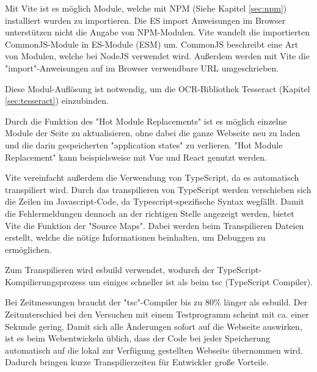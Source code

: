 

Mit Vite ist es möglich Module, welche mit NPM (Siehe Kapitel \ref{sec:npm}) installiert wurden zu importieren. 
Die ES import Anweisungen im Browser unterstützen nicht die Angabe von NPM-Modulen. Vite wandelt die importierten CommonJS-Module in ES-Module (ESM) um. CommonJS beschreibt eine Art von Modulen, welche bei NodeJS verwendet wird. Außerdem werden mit Vite die "import"-Anweisungen auf im Browser verwendbare URL umgeschrieben. \cite{ViteFeatures}


Diese Modul-Auflösung ist notwendig, um die OCR-Bibliothek Tesseract (Kapitel \ref{sec:tesseract}) einzubinden. 


Durch die Funktion des "Hot Module Replacements" ist es möglich einzelne Module der Seite zu aktualisieren, ohne dabei die ganze Webseite neu zu laden und die darin gespeicherten "application states" zu verlieren. "Hot Module Replacement" kann beispielsweise mit Vue und React genutzt werden. \cite{ViteFeatures}
  

Vite vereinfacht außerdem die Verwendung von TypeScript, da es automatisch transpiliert wird. 
Durch das transpilieren von TypeScript werden verschieben sich die Zeilen im Javascript-Code, da Typescript-spezifische Syntax wegfällt. 
Damit die Fehlermeldungen dennoch an der richtigen Stelle angezeigt werden, bietet Vite die Funktion der "Source Maps". 
Dabei werden beim Transpilieren Dateien erstellt, welche die nötige Informationen beinhalten, um Debuggen zu ermöglichen.

Zum Transpilieren wird esbuild\cite{esbuild} verwendet, wodurch der TypeScript-Kompilierungsprozess um einiges schneller ist als beim tsc (TypeScript Compiler). \cite{ViteFeatures}

Bei Zeitmessungen braucht der "tsc"-Compiler bis zu 80\% länger als esbuild. Der Zeitunterschied bei den Versuchen mit einem Testprogramm scheint mit ca. einer Sekunde gering. Damit sich alle Änderungen sofort auf die Webseite auswirken, ist es beim Webentwickeln üblich, dass der Code bei jeder Speicherung automatisch auf die lokal zur Verfügung gestellten Webseite übernommen wird. Dadurch bringen kurze Transpilierzeiten für Entwickler große Vorteile. 

